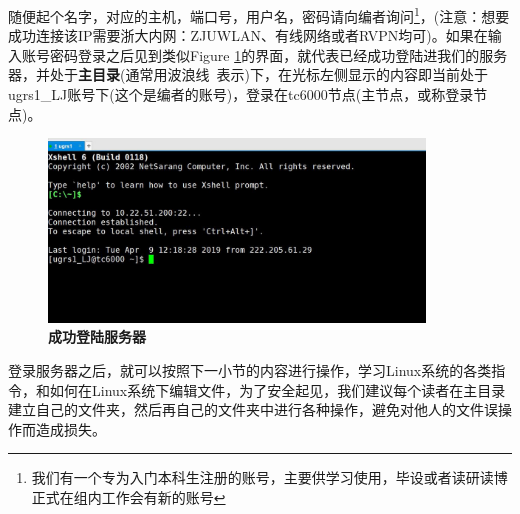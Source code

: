 \documentclass[12pt,a4paper,openany,twoside]{book}
\numberwithin{equation}{section}
\begin{document}
    随便起个名字，对应的主机，端口号，用户名，密码请向编者询问\footnote{我们有一个专为入门本科生注册的账号，主要供学习使用，毕设或者读研读博正式在组内工作会有新的账号}，(注意：想要成功连接该IP需要浙大内网：ZJUWLAN、有线网络或者RVPN均可)。如果在输入账号密码登录之后见到类似Figure \ref{登录服务器}的界面，就代表已经成功登陆进我们的服务器，并处于\textbf{主目录}(通常用波浪线~表示)下，在光标左侧显示的内容即当前处于ugrs1\_LJ账号下(这个是编者的账号)，登录在tc6000节点(主节点，或称登录节点)。
    \begin{figure}
      \centering
      \includegraphics[width = 10cm]{fig/xshell3.jpg}
      \caption{\textbf{成功登陆服务器}}
      \label{登录服务器}
    \end{figure}
    
    登录服务器之后，就可以按照下一小节的内容进行操作，学习Linux系统的各类指令，和如何在Linux系统下编辑文件，为了安全起见，我们建议每个读者在主目录建立自己的文件夹，然后再自己的文件夹中进行各种操作，避免对他人的文件误操作而造成损失。
\end{document}
